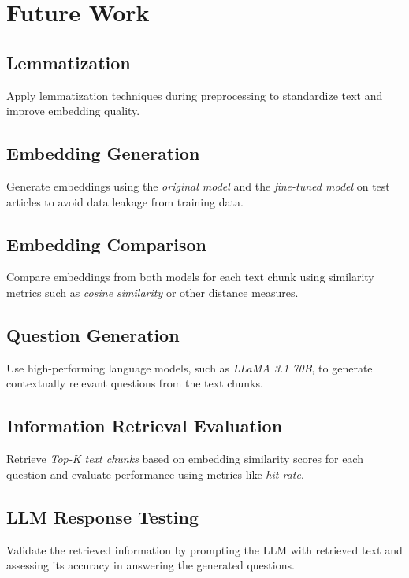 \chapter{Future Work}

\section{Lemmatization}
Apply lemmatization techniques during preprocessing to standardize text and improve embedding quality.

\section{Embedding Generation}
Generate embeddings using the \textit{original model} and the \textit{fine-tuned model} on test articles to avoid data leakage from training data.


\section{Embedding Comparison}
Compare embeddings from both models for each text chunk using similarity metrics such as \textit{cosine similarity} or other distance measures.

\section{Question Generation}
Use high-performing language models, such as \textit{LLaMA 3.1 70B}, to generate contextually relevant questions from the text chunks.

\section{Information Retrieval Evaluation}
Retrieve \textit{Top-K text chunks} based on embedding similarity scores for each question and evaluate performance using metrics like \textit{hit rate}.

\section{LLM Response Testing}
Validate the retrieved information by prompting the LLM with retrieved text and assessing its accuracy in answering the generated questions.
